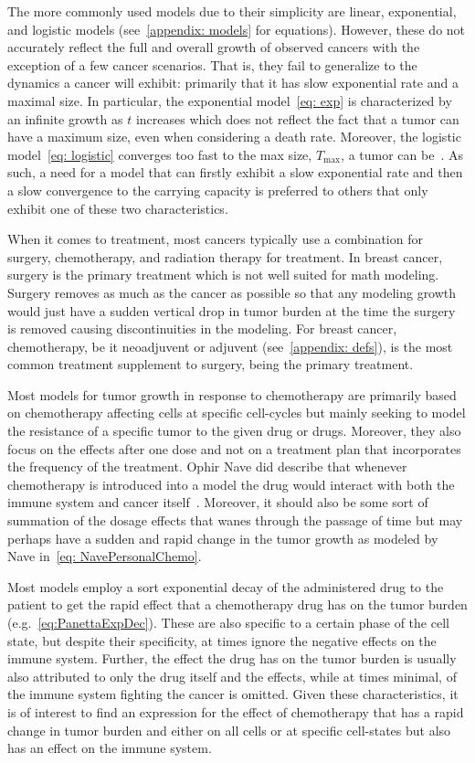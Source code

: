 \documentclass[11pt]{amsart}
\begin{document}
The more commonly used models due to their simplicity are linear, exponential, and logistic models (see\ \ref{appendix: models} for equations).
However, these do not accurately reflect the full and overall growth of observed cancers with the exception of a few cancer scenarios.
That is, they fail to generalize to the dynamics a cancer will exhibit: primarily that it has slow exponential rate and a maximal size.
In particular, the exponential model\ \eqref{eq: exp} is characterized by an infinite growth as $t$ increases which does not reflect the fact that a tumor can have a maximum size, even when considering a death rate.
Moreover, the logistic model\ \eqref{eq: logistic} converges too fast to the max size, $T_{\max}$, a tumor can be\ \cite{Steb23}.
As such, a need for a model that can firstly exhibit a slow exponential rate and then a slow convergence to the carrying capacity is preferred to others that only exhibit one of these two characteristics.

When it comes to treatment, most cancers typically use a combination for surgery, chemotherapy, and radiation therapy for treatment.
In breast cancer, surgery is the primary treatment which is not well suited for math modeling. 
Surgery removes as much as the cancer as possible so that any modeling growth would just have a sudden vertical drop in tumor burden at the time the surgery is removed causing discontinuities in the modeling.
For breast cancer, chemotherapy, be it neoadjuvent or adjuvent (see\ \ref{appendix: defs}), is the most common treatment supplement to surgery, being the primary treatment.

Most models for tumor growth in response to chemotherapy are primarily based on chemotherapy affecting cells at specific cell-cycles but mainly seeking to model the resistance of a specific tumor to the given drug or drugs.
Moreover, they also focus on the effects after one dose and not on a treatment plan that incorporates the frequency of the treatment.
Ophir Nave did describe that whenever chemotherapy is introduced into a model the drug would interact with both the immune system and cancer itself\ \cite{NAVE2022e09288}.
Moreover, it should also be some sort of summation of the dosage effects that wanes through the passage of time but may perhaps have a sudden and rapid change in the tumor growth as modeled by Nave in\ \eqref{eq: NavePersonalChemo}.

Most models employ a sort exponential decay of the administered drug to the patient to get the rapid effect that a chemotherapy drug has on the tumor burden (e.g.\ \eqref{eq:PanettaExpDec}).
These are also specific to a certain phase of the cell state, but despite their specificity, at times ignore the negative effects on the immune system.
Further, the effect the drug has on the tumor burden is usually also attributed to only the drug itself and the effects, while at times minimal, of the immune system fighting the cancer is omitted.
Given these characteristics, it is of interest to find an expression for the effect of chemotherapy that has a rapid change in tumor burden and either on all cells or at specific cell-states but also has an effect on the immune system.
\end{document}
